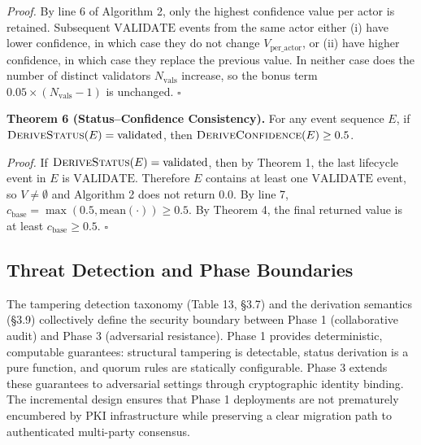 \emph{Proof.} By line 6 of Algorithm 2, only the highest confidence value per actor is retained. Subsequent \(\text{VALIDATE}\) events from the same actor either (i) have lower confidence, in which case they do not change \(V_{\text{per\_actor}}\), or (ii) have higher confidence, in which case they replace the previous value. In neither case does the number of distinct validators \(N_{\text{vals}}\) increase, so the bonus term \(0.05 \times (N_{\text{vals}} - 1)\) is unchanged. \(\square\)

\textbf{Theorem 6 (Status--Confidence Consistency).} For any event sequence \(E\), if \(\textsc{DeriveStatus}(E) = \text{validated}\), then \(\textsc{DeriveConfidence}(E) \geq 0.5\).

\emph{Proof.} If \(\textsc{DeriveStatus}(E) = \text{validated}\), then by Theorem 1, the last lifecycle event in \(E\) is \(\text{VALIDATE}\). Therefore \(E\) contains at least one \(\text{VALIDATE}\) event, so \(V \neq \emptyset\) and Algorithm 2 does not return 0.0. By line 7, \(c_{\text{base}} = \max(0.5, \text{mean}(\cdot)) \geq 0.5\). By Theorem 4, the final returned value is at least \(c_{\text{base}} \geq 0.5\). \(\square\)

\subsection{Threat Detection and Phase Boundaries}\label{threat-detection-and-phase-boundaries}

The tampering detection taxonomy (Table 13, §3.7) and the derivation semantics (§3.9) collectively define the security boundary between Phase 1 (collaborative audit) and Phase 3 (adversarial resistance). Phase 1 provides deterministic, computable guarantees: structural tampering is detectable, status derivation is a pure function, and quorum rules are statically configurable. Phase 3 extends these guarantees to adversarial settings through cryptographic identity binding. The incremental design ensures that Phase 1 deployments are not prematurely encumbered by PKI infrastructure while preserving a clear migration path to authenticated multi-party consensus.
